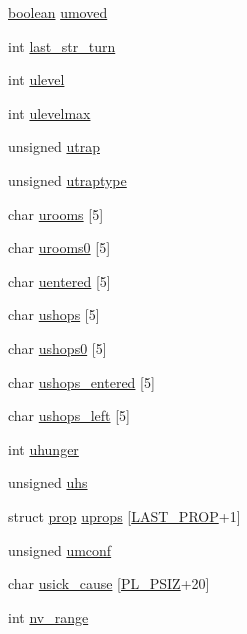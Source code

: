 \begin{DoxyCompactItemize}
\hyperlink{global_8h_a531b10dd351aa162d7dcccd1966308b8}{boolean} \hyperlink{structyou_a48fcfb29e5f7a798f8f87e1e3a0c5c47}{umoved}
\item 
int \hyperlink{structyou_ac3f0aa62ba06486db16c5ae6dc1b3753}{last\+\_\+str\+\_\+turn}
\item 
int \hyperlink{structyou_a6c7263bb25b91825bf7ecaab470d771a}{ulevel}
\item 
int \hyperlink{structyou_a4ef7d6892966c8f8250e2d675bc1de05}{ulevelmax}
\item 
unsigned \hyperlink{structyou_a7250d3b13a54b76d846b754a2a6f3fa6}{utrap}
\item 
unsigned \hyperlink{structyou_a1753632ed4b3b8dea40466c1c92fce19}{utraptype}
\item 
char \hyperlink{structyou_a3a44bd4651bae48019fe01f96afc457a}{urooms} \mbox{[}5\mbox{]}
\item 
char \hyperlink{structyou_ad096000dbf05d6d67c149dac6213ff6b}{urooms0} \mbox{[}5\mbox{]}
\item 
char \hyperlink{structyou_a21d26a5db81fedeac63de8b7f5205151}{uentered} \mbox{[}5\mbox{]}
\item 
char \hyperlink{structyou_a1bc3b5ca1e5d9957ab3a7f451c069f47}{ushops} \mbox{[}5\mbox{]}
\item 
char \hyperlink{structyou_a566d23da377bbabdcc013adc0dbdbf41}{ushops0} \mbox{[}5\mbox{]}
\item 
char \hyperlink{structyou_a6bc37f3ed894820e70fb66f2c2998caf}{ushops\+\_\+entered} \mbox{[}5\mbox{]}
\item 
char \hyperlink{structyou_a3b24bf263b720623e3e2be14f25ce0fb}{ushops\+\_\+left} \mbox{[}5\mbox{]}
\item 
int \hyperlink{structyou_a66fb9624339df35ac2f9f08fdccde6c9}{uhunger}
\item 
unsigned \hyperlink{structyou_a4ba11c494ae99f9d1ba9d65ad07c5097}{uhs}
\item 
struct \hyperlink{structprop}{prop} \hyperlink{structyou_a922add41f13d0ca6d1665b8754964030}{uprops} \mbox{[}\hyperlink{prop_8h_a68aee8c91ba0472f9f88e6428c38938c}{L\+A\+S\+T\+\_\+\+P\+R\+O\+P}+1\mbox{]}
\item 
unsigned \hyperlink{structyou_ae6400919d6031ac41b98d31ce9906308}{umconf}
\item 
char \hyperlink{structyou_a4a800dfd61b910ac10dc56ec67fe8452}{usick\+\_\+cause} \mbox{[}\hyperlink{global_8h_a3ae8e8034f6e3d87dd1925f45090003f}{P\+L\+\_\+\+P\+S\+I\+Z}+20\mbox{]}
\item 
int \hyperlink{structyou_ae113edf3224fab48b8169fb457f26166}{nv\+\_\+range}

\end{DoxyCompactItemize}
